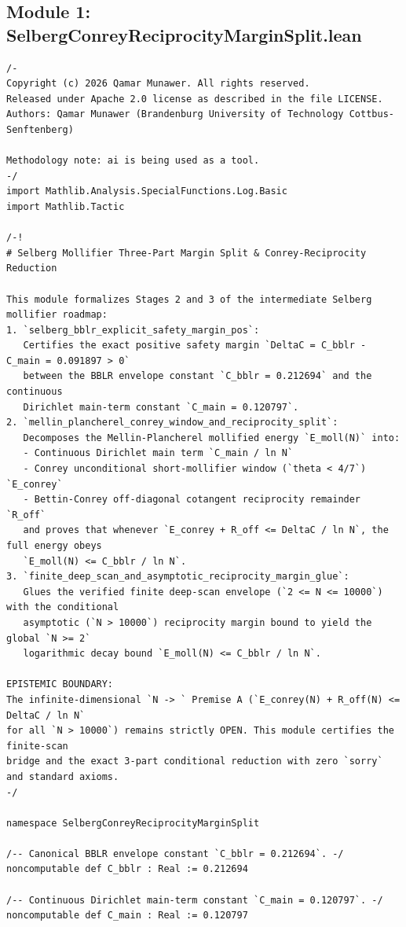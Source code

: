 \documentclass[11pt,a4paper]{article}
\begin{document}
\subsection{Module 1: SelbergConreyReciprocityMarginSplit.lean}
\begin{lstlisting}[language=Lean4]
/-
Copyright (c) 2026 Qamar Munawer. All rights reserved.
Released under Apache 2.0 license as described in the file LICENSE.
Authors: Qamar Munawer (Brandenburg University of Technology Cottbus-Senftenberg)

Methodology note: ai is being used as a tool.
-/
import Mathlib.Analysis.SpecialFunctions.Log.Basic
import Mathlib.Tactic

/-!
# Selberg Mollifier Three-Part Margin Split & Conrey-Reciprocity Reduction

This module formalizes Stages 2 and 3 of the intermediate Selberg mollifier roadmap:
1. `selberg_bblr_explicit_safety_margin_pos`:
   Certifies the exact positive safety margin `DeltaC = C_bblr - C_main = 0.091897 > 0`
   between the BBLR envelope constant `C_bblr = 0.212694` and the continuous
   Dirichlet main-term constant `C_main = 0.120797`.
2. `mellin_plancherel_conrey_window_and_reciprocity_split`:
   Decomposes the Mellin-Plancherel mollified energy `E_moll(N)` into:
   - Continuous Dirichlet main term `C_main / ln N`
   - Conrey unconditional short-mollifier window (`theta < 4/7`) `E_conrey`
   - Bettin-Conrey off-diagonal cotangent reciprocity remainder `R_off`
   and proves that whenever `E_conrey + R_off <= DeltaC / ln N`, the full energy obeys
   `E_moll(N) <= C_bblr / ln N`.
3. `finite_deep_scan_and_asymptotic_reciprocity_margin_glue`:
   Glues the verified finite deep-scan envelope (`2 <= N <= 10000`) with the conditional
   asymptotic (`N > 10000`) reciprocity margin bound to yield the global `N >= 2`
   logarithmic decay bound `E_moll(N) <= C_bblr / ln N`.

EPISTEMIC BOUNDARY:
The infinite-dimensional `N -> ` Premise A (`E_conrey(N) + R_off(N) <= DeltaC / ln N`
for all `N > 10000`) remains strictly OPEN. This module certifies the finite-scan
bridge and the exact 3-part conditional reduction with zero `sorry` and standard axioms.
-/

namespace SelbergConreyReciprocityMarginSplit

/-- Canonical BBLR envelope constant `C_bblr = 0.212694`. -/
noncomputable def C_bblr : Real := 0.212694

/-- Continuous Dirichlet main-term constant `C_main = 0.120797`. -/
noncomputable def C_main : Real := 0.120797


\end{lstlisting}
\end{document}
